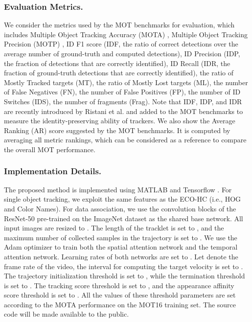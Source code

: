 \documentclass[runningheads]{llncs}
\begin{document}
  \subsubsection{Evaluation Metrics.}
  We consider the metrics used by the MOT benchmarks \cite{MOT16,MOT15} for evaluation, which includes Multiple Object Tracking Accuracy (MOTA) \cite{clear_mot}, Multiple Object Tracking Precision (MOTP) \cite{clear_mot}, ID F1 score \cite{IDF1} (IDF, the ratio of correct detections over the average number of ground-truth and computed detections), ID Precision \cite{IDF1} (IDP, the fraction of detections that are correctly identified), ID Recall \cite{IDF1} (IDR, the fraction of ground-truth detections that are correctly identified), the ratio of Mostly Tracked targets (MT), the ratio of Mostly Lost targets (ML), the number of False Negatives (FN), the number of False Positives (FP), the number of ID Switches (IDS), the number of fragments (Frag). Note that IDF, IDP, and IDR are recently introduced by Ristani et al. \cite{IDF1} and added to the MOT benchmarks to measure the identity-preserving ability of trackers. We also show the Average Ranking (AR) score suggested by the MOT benchmarks. It is computed by averaging all metric rankings, which can be considered as a reference to compare the overall MOT performance.
  
  \subsubsection{Implementation Details.}
  The proposed method is implemented using MATLAB and Tensorflow \cite{tensorflow}. For single object tracking, we exploit the same features as the ECO-HC \cite{ECO} (i.e., HOG and Color Names). For data association, we use the convolution blocks of the ResNet-50 pre-trained on the ImageNet dataset \cite{ImageNet} as the shared base network. All input images are resized to . The length of the tracklet is set to , and the maximum number of collected samples in the trajectory is set to . We use the Adam \cite{adam} optimizer to train both the spatial attention network and the temporal attention network. Learning rates of both networks are set to . Let  denote the frame rate of the video, the interval for computing the target velocity is set to . The trajectory initialization threshold is set to , while the termination threshold is set to . The tracking score threshold is set to , and the appearance affinity score threshold is set to . All the values of these threshold parameters are set according to the MOTA performance on the MOT16 training set. The source code will be made available to the public.
  
\end{document}

